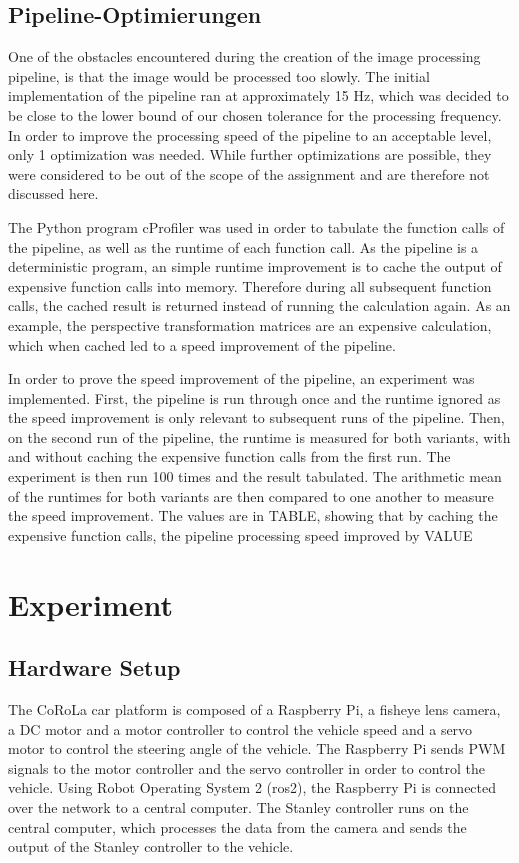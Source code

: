 \documentclass[arbeit=studie,oneside,BCOR=12mm]{ArbeitRST}
\begin{document}
\section{Pipeline-Optimierungen}

One of the obstacles encountered during the creation of the image processing
pipeline, is that the image would be processed too slowly. The initial
implementation of the pipeline ran at approximately 15 Hz, which was decided to
be close to the lower bound of our chosen tolerance for the processing
frequency. In order to improve the processing speed of the pipeline to an
acceptable level, only 1 optimization was needed. While further optimizations
are possible, they were considered to be out of the scope of the assignment and
are therefore not discussed here.

The Python program cProfiler was used in order to tabulate the function calls
of the pipeline, as well as the runtime of each function call. As the pipeline
is a deterministic program, an simple runtime improvement is to cache the
output of expensive function calls into memory. Therefore during all subsequent
function calls, the cached result is returned instead of running the
calculation again. As an example, the perspective transformation matrices are
an expensive calculation, which when cached led to a speed improvement of the
pipeline.

In order to prove the speed improvement of the pipeline, an experiment was
implemented. First, the pipeline is run through once and the runtime ignored as
the speed improvement is only relevant to subsequent runs of the pipeline.
Then, on the second run of the pipeline, the runtime is measured for both
variants, with and without caching the expensive function calls from the first
run. The experiment is then run 100 times and the result tabulated. The
arithmetic mean of the runtimes for both variants are then compared to one
another to measure the speed improvement. The values are in TABLE, showing that
by caching the expensive function calls, the pipeline processing speed improved
by VALUE%

\chapter{Experiment}
\section{Hardware Setup}

The CoRoLa car platform is composed of a Raspberry Pi, a fisheye lens camera, a
DC motor and a motor controller to control the vehicle speed and a servo motor
to control the steering angle of the vehicle. The Raspberry Pi sends PWM
signals to the motor controller and the servo controller in order to control
the vehicle. Using Robot Operating System 2 (ros2), the Raspberry Pi is
connected over the network to a central computer. The Stanley controller runs
on the central computer, which processes the data from the camera and sends the
output of the Stanley controller to the vehicle.
\end{document}
